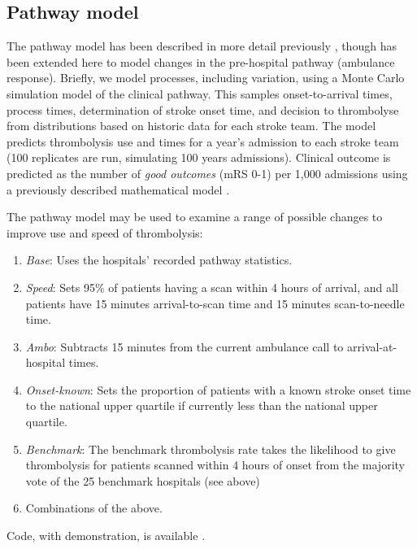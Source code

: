 \subsection{Pathway model}

The pathway model has been described in more detail previously \cite{allen_use_2022}, though has been extended here to model changes in the pre-hospital pathway (ambulance response). Briefly, we model processes, including variation, using a Monte Carlo simulation model of the clinical pathway. This samples onset-to-arrival times, process times, determination of stroke onset time, and decision to thrombolyse from distributions based on historic data for each stroke team. The model predicts thrombolysis use and times for a year's admission to each stroke team (100 replicates are run, simulating 100 years admissions). Clinical outcome is predicted as the number of \textit{good outcomes} (mRS 0-1) per 1,000 admissions using a previously described mathematical model \cite{allen_estimation_2020}.

The pathway model may be used to examine a range of possible changes to improve use and speed of thrombolysis:

\begin{enumerate}

    \item \textit{Base}: Uses the hospitals’ recorded pathway statistics.

    \item \textit{Speed}: Sets 95\% of patients having a scan within 4 hours of arrival, and all patients have 15 minutes arrival-to-scan time and 15 minutes scan-to-needle time.

    \item \textit{Ambo}: Subtracts 15 minutes from the current ambulance call to arrival-at-hospital times.

    \item  \textit{Onset-known}: Sets the proportion of patients with a known stroke onset time to the national upper quartile if currently less than the national upper quartile.

    \item \textit{Benchmark}: The benchmark thrombolysis rate takes the likelihood to give thrombolysis for patients scanned within 4 hours of onset from the majority vote of the 25 benchmark hospitals (see above)

    \item Combinations of the above.
    
\end{enumerate}

Code, with demonstration, is available \cite{allen_samuel_code_2024}.